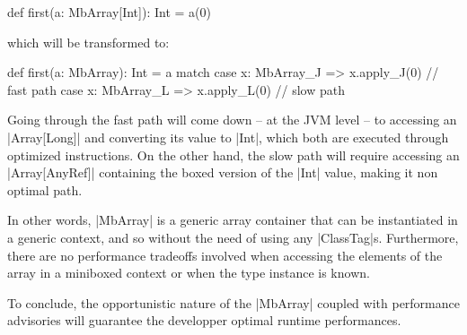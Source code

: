 \begin{lstlisting-nobreak}
 def first(a: MbArray[Int]): Int = a(0)
\end{lstlisting-nobreak}

which will be transformed to:

\begin{lstlisting-nobreak}
 def first(a: MbArray): Int = 
   a match {
     case x: MbArray_J => x.apply_J(0) // fast path
     case x: MbArray_L => x.apply_L(0) // slow path
   }
\end{lstlisting-nobreak}

Going through the fast path will come down -- at the JVM level -- to accessing an |Array[Long]| and converting its value to |Int|, which both are executed through optimized instructions. On the other hand, the slow path will require accessing an |Array[AnyRef]| containing the boxed version of the |Int| value, making it non optimal path.

In other words, |MbArray| is a generic array container that can be instantiated in a generic context, and so without the need of using any |ClassTag|s. Furthermore, there are no performance tradeoffs involved when accessing the elements of the array in a miniboxed context or when the type instance is known. 


To conclude, the opportunistic nature of the |MbArray| coupled with performance advisories will guarantee the developper optimal runtime performances. 

